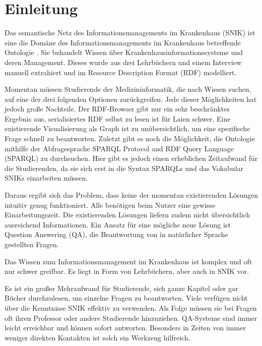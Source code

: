 \documentclass[utf8,biblatex]{lni}
\begin{document}
%

\section{Einleitung}

Das semantische Netz des Informationsmanagements im Krankenhaus (SNIK) ist eine
die Domäne des Informationsmanagements im Krankenhaus betreffende Ontologie \cite{domaene}.
Sie behandelt Wissen über Krankenhausinformationssysteme und deren Management.
Dieses wurde aus drei Lehrbüchern \cite{bb,ob,he} und einem Interview \cite{ciosurvey} manuell extrahiert und im Resource Description Format (RDF) modelliert.

Momentan müssen Studierende der Medizininformatik, die nach Wissen suchen, auf eine der drei folgenden Optionen zurückgreifen.
Jede dieser Möglichkeiten hat jedoch große Nachteile.
Der RDF-Browser gibt nur ein sehr beschränktes Ergebnis aus, serialisiertes RDF selbst zu lesen ist für Laien schwer.
Eine existierende Visualisierung als Graph ist zu unübersichtlich, um eine spezifische Frage schnell zu beantworten.
Zuletzt gibt es noch die Möglichkeit, die Ontologie mithilfe der Abfragesprache SPARQL Protocol and RDF Query Language (SPARQL) zu durchsuchen.
Hier gibt es jedoch einen erheblichen Zeitaufwand für die Studierenden, da sie sich erst in die Syntax SPARQLs und das Vokabular SNIKs einarbeiten müssen.

Daraus ergibt sich das Problem, dass keine der momentan existierenden Lösungen intuitiv genug funktioniert.
Alle benötigen beim Nutzer eine gewisse Einarbeitungszeit.
Die existierenden Lösungen liefern zudem nicht übersichtlich ausreichend Informationen.
Ein Ansatz für eine mögliche neue Lösung ist Question Answering (QA), die Beantwortung von in natürlicher Sprache gestellten Fragen.

Das Wissen zum Informationsmanagement im Krankenhaus ist komplex und oft nur schwer greifbar.
Es liegt in Form von Lehrbüchern, aber auch in SNIK vor.

Es ist ein großer Mehraufwand für Studierende, sich ganze Kapitel oder gar Bücher durchzulesen, um einzelne Fragen zu beantworten.
Viele verfügen nicht über die Kenntnisse SNIK effektiv zu verwenden.
Als Folge müssen sie bei Fragen oft ihren Professor oder andere Studierende hinzuziehen.
QA-Systeme sind immer leicht erreichbar und können sofort antworten.
Besonders in Zeiten von immer weniger direkten Kontakten ist solch ein Werkzeug hilfreich.
\end{document}
